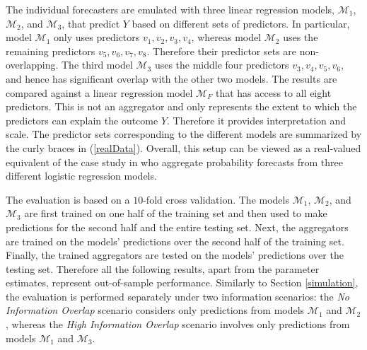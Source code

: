 \documentclass[11pt]{article}
\theoremstyle{definition}
\theoremstyle{definition}
\begin{document}
The individual forecasters are emulated with three linear regression models, $\mathcal{M}_1$, $\mathcal{M}_2$, and $\mathcal{M}_3$, that predict $Y$ based on different sets of predictors. In particular, model $\mathcal{M}_1$ only uses predictors $v_1, v_2, v_3, v_4$, whereas model $\mathcal{M}_2$ uses the remaining predictors $v_5, v_6, v_7, v_8$. Therefore their predictor sets are non-overlapping. The third model $\mathcal{M}_3$ uses the middle four predictors $v_3, v_4, v_5, v_6$, and hence has significant overlap with the other two models. The results are compared against a linear regression model $\mathcal{M}_F$ that has access to all eight predictors. This is not an aggregator and only represents the extent to which the predictors can explain the outcome $Y$. Therefore it provides interpretation and scale. The predictor sets corresponding to the different models are summarized by the curly braces in (\ref{realData}). Overall, this setup can be viewed as a real-valued equivalent of the case study in \cite{Ranjan08} who aggregate probability forecasts from three different logistic regression models. 

The evaluation is based on a $10$-fold cross validation. The models $\mathcal{M}_1$, $\mathcal{M}_2$, and $\mathcal{M}_3$ are first trained on one half of the training set and then used to make  predictions for the second half and the entire testing set. Next, the aggregators are  trained on the models' predictions over the second half of the training set. Finally, the trained aggregators are tested on the models' predictions over the testing set. Therefore all the following results, apart from the parameter estimates, represent out-of-sample performance. Similarly to Section \ref{simulation}, the evaluation is performed separately under two information scenarios: the \textit{No Information Overlap} scenario considers only predictions from models $\mathcal{M}_1$ and $\mathcal{M}_2$, whereas the \textit{High Information Overlap} scenario involves only predictions from models $\mathcal{M}_1$ and $\mathcal{M}_3$. 
\end{document}
